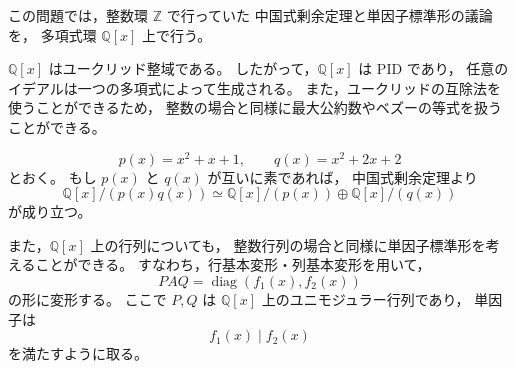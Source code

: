 \begin{background}
	この問題では，整数環 \(\mathbb{Z}\) で行っていた
	中国式剰余定理と単因子標準形の議論を，
	多項式環 \(\mathbb{Q}[x]\) 上で行う。
	
	\(\mathbb{Q}[x]\) はユークリッド整域である。
	したがって，\(\mathbb{Q}[x]\) は PID であり，
	任意のイデアルは一つの多項式によって生成される。
	また，ユークリッドの互除法を使うことができるため，
	整数の場合と同様に最大公約数やベズーの等式を扱うことができる。
	
	\[
	p(x)=x^2+x+1,
	\qquad
	q(x)=x^2+2x+2
	\]
	とおく。
	もし \(p(x)\) と \(q(x)\) が互いに素であれば，
	中国式剰余定理より
	\[
	\mathbb{Q}[x]/(p(x)q(x))
	\simeq
	\mathbb{Q}[x]/(p(x))
	\oplus
	\mathbb{Q}[x]/(q(x))
	\]
	が成り立つ。
	
	また，\(\mathbb{Q}[x]\) 上の行列についても，
	整数行列の場合と同様に単因子標準形を考えることができる。
	すなわち，行基本変形・列基本変形を用いて，
	\[
	PAQ=
	\operatorname{diag}(f_1(x),f_2(x))
	\]
	の形に変形する。
	ここで \(P,Q\) は \(\mathbb{Q}[x]\) 上のユニモジュラー行列であり，
	単因子は
	\[
	f_1(x)\mid f_2(x)
	\]
	を満たすように取る。
\end{background}

